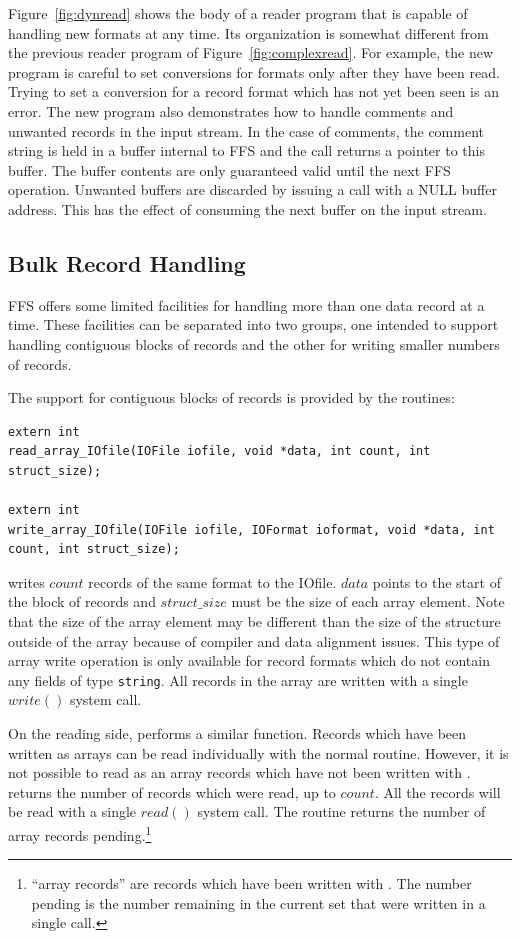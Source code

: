 Figure~\ref{fig:dynread} shows the body of a reader program that is capable of
handling new formats at any time.  Its organization is somewhat different from
the previous reader program of Figure~\ref{fig:complexread}.  For example, the
new program is careful to set conversions for formats only after they have
been read.  Trying to set a conversion for a record format which has not yet
been seen is an error.  The new program also demonstrates how to handle
comments and unwanted records in the input stream.  In the case of comments,
the comment string is held in a buffer internal to FFS and the
 call returns a pointer to this buffer.  The buffer
contents are only guaranteed valid until the next FFS operation.  Unwanted
buffers are discarded by issuing a  call with a NULL buffer
address.  This has the effect of consuming the next buffer on the input
stream.  

\subsection{Bulk Record Handling}

FFS offers some limited facilities for handling more than one data record at
a time.  These facilities can be separated into two groups, one intended to
support handling contiguous blocks of records and the other for writing smaller
numbers of records.

The support for contiguous blocks of records is provided by the routines:
\begin{verbatim}
extern int
read_array_IOfile(IOFile iofile, void *data, int count, int struct_size);

extern int
write_array_IOfile(IOFile iofile, IOFormat ioformat, void *data, int count, int struct_size);
\end{verbatim}
 writes $count$ records of the same format to the
IOfile.  $data$ points to the start of the block of records and $struct\_size$
must be the size of each array element.  Note that the size of the array
element may be different than the size of the structure outside of the array
because of compiler and data alignment issues.  This type of array write
operation is only available for record formats which do not contain any fields
of type {\tt string}.  All records in the array are written with a single
$write()$ system call.

On the reading side,  performs a similar function.
Records which have been written as arrays can be read individually with the
normal  routine.  However, it is not possible to read as an
array records which have not been written with .
 returns the number of records which were read, up to
$count$.  All the records will be read with a single $read()$ system call.
The routine  returns the number of array
records pending.\footnote{``array records'' are records which have been
written with .  The number pending is the number
remaining in the current set that were written in a single call.}

